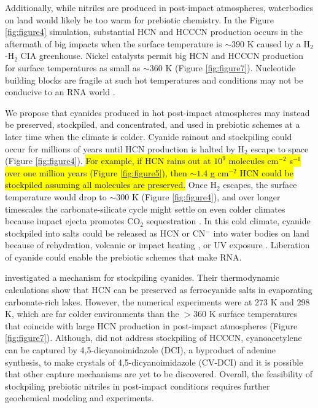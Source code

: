 Additionally, while nitriles are produced in post-impact atmospheres, waterbodies on land would likely be too warm for prebiotic chemistry. In the Figure \ref{fig:figure4} simulation, substantial HCN and HCCCN production occurs in the aftermath of big impacts when the surface temperature is $\sim 390$ K caused by a H$_2$-H$_2$ CIA greenhouse. Nickel catalysts permit big HCN and HCCCN production for surface temperatures as small as $\sim 360$ K (Figure \ref{fig:figure7}). Nucleotide building blocks are fragile at such hot temperatures and conditions may not be conducive to an RNA world \citep{Bada_2002}. 

We propose that cyanides produced in hot post-impact atmospheres may instead be preserved, stockpiled, and concentrated, and used in prebiotic schemes at a later time when the climate is colder. Cyanide rainout and stockpiling could occur for millions of years until HCN production is halted by H$_2$ escape to space (Figure \ref{fig:figure4}). \hl{For example, if HCN rains out at $10^{9}$ molecules cm$^{-2}$ s$^{-1}$ over one million years (Figure \mbox{\ref{fig:figure5}}), then $\sim 1.4$ g cm$^{-2}$ HCN could be stockpiled assuming all molecules are preserved.} Once H$_2$ escapes, the surface temperature would drop to $\sim 300$ K (Figure \ref{fig:figure4}), and over longer timescales the carbonate-silicate cycle might settle on even colder climates because impact ejecta promotes CO$_2$ sequestration \citep{Kadoya_2020}. In this cold climate, cyanide stockpiled into salts could be released as HCN or CN$^-$ into water bodies on land because of rehydration, volcanic or impact heating \citep{Patel_2015,Sasselov_2020}, or UV exposure \citep{Todd_2022}. Liberation of cyanide could enable the prebiotic schemes that make RNA.

\citet{Toner_2019} investigated a mechanism for stockpiling cyanides. Their thermodynamic calculations show that HCN can be preserved as ferrocyanide salts in evaporating carbonate-rich lakes. However, the \citet{Toner_2019} numerical experiments were at 273 K and 298 K, which are far colder environments than the $> 360$ K surface temperatures that coincide with large HCN production in post-impact atmospheres (Figure \ref{fig:figure7}). Although, \citet{Toner_2019} did not address stockpiling of HCCCN, cyanoacetylene can be captured by 4,5-dicyanoimidazole (DCI), a byproduct of adenine synthesis, to make crystals of 4,5-dicyanoimidazole (CV-DCI) \citep{Ritson_2022} and it is possible that other capture mechanisms are yet to be discovered. Overall, the feasibility of stockpiling prebiotic nitriles in post-impact conditions requires further geochemical modeling and experiments.

